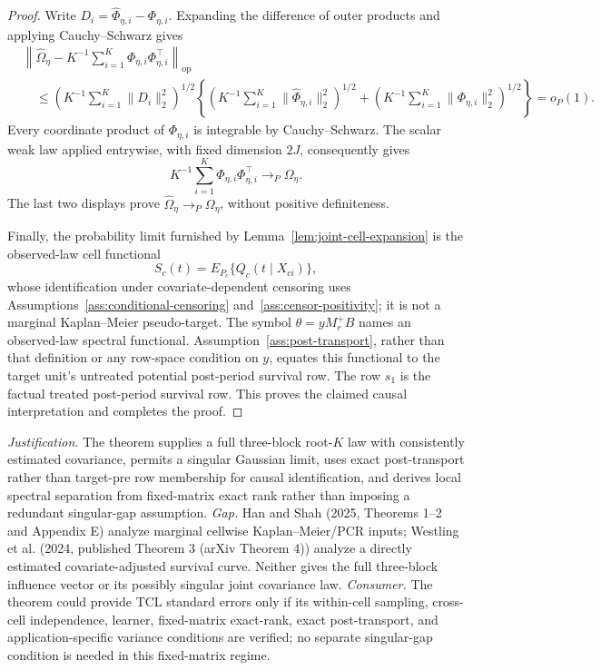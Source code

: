\documentclass{article}
\begin{document}
\begin{proof}
Write \(D_i=\widehat\Phi_{\eta,i}-\Phi_{\eta,i}\). Expanding the difference of outer products and applying Cauchy--Schwarz gives
\[
\begin{aligned}
 &\left\|\widehat\Omega_\eta-
 K^{-1}\sum_{i=1}^K\Phi_{\eta,i}\Phi_{\eta,i}^\top\right\|_{\mathrm{op}}\\
 &\quad\le
 \left(K^{-1}\sum_{i=1}^K\|D_i\|_2^2\right)^{1/2}
 \left\{
  \left(K^{-1}\sum_{i=1}^K\|\widehat\Phi_{\eta,i}\|_2^2\right)^{1/2}
  +
  \left(K^{-1}\sum_{i=1}^K\|\Phi_{\eta,i}\|_2^2\right)^{1/2}
 \right\}
 =o_P(1).
\end{aligned}
\]
Every coordinate product of \(\Phi_{\eta,i}\) is integrable by Cauchy--Schwarz. The scalar weak law applied entrywise, with fixed dimension \(2J\), consequently gives
\[
 K^{-1}\sum_{i=1}^K\Phi_{\eta,i}\Phi_{\eta,i}^\top
 \to_P\Omega_\eta.
\]
The last two displays prove \(\widehat\Omega_\eta\to_P\Omega_\eta\), without positive definiteness.

Finally, the probability limit furnished by Lemma~\ref{lem:joint-cell-expansion} is the observed-law cell functional
\[
 S_c(t)=E_{P_c}\{Q_c(t\mid X_{ci})\},
\]
whose identification under covariate-dependent censoring uses Assumptions~\ref{ass:conditional-censoring} and~\ref{ass:censor-positivity}; it is not a marginal Kaplan--Meier pseudo-target. The symbol \(\theta=yM_r^+B\) names an observed-law spectral functional. Assumption~\ref{ass:post-transport}, rather than that definition or any row-space condition on \(y\), equates this functional to the target unit's untreated potential post-period survival row. The row \(s_1\) is the factual treated post-period survival row. This proves the claimed causal interpretation and completes the proof.
\end{proof}
\par\smallskip\noindent \textit{Justification.} The theorem supplies a full three-block root-\(K\) law with consistently estimated covariance, permits a singular Gaussian limit, uses exact post-transport rather than target-pre row membership for causal identification, and derives local spectral separation from fixed-matrix exact rank rather than imposing a redundant singular-gap assumption. \textit{Gap.} Han and Shah (2025, Theorems 1--2 and Appendix E) analyze marginal cellwise Kaplan--Meier/PCR inputs; Westling et al. (2024, published Theorem 3 (arXiv Theorem 4)) analyze a directly estimated covariate-adjusted survival curve. Neither gives the full three-block influence vector or its possibly singular joint covariance law. \textit{Consumer.} The theorem could provide TCL standard errors only if its within-cell sampling, cross-cell independence, learner, fixed-matrix exact-rank, exact post-transport, and application-specific variance conditions are verified; no separate singular-gap condition is needed in this fixed-matrix regime.
\end{document}
